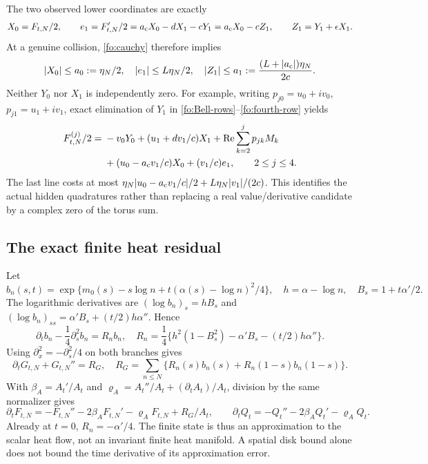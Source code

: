\documentclass[11pt]{article}
\numberwithin{equation}{section}
\theoremstyle{definition}
\theoremstyle{remark}
\begin{document}
The two observed lower coordinates are exactly
\begin{equation}
X_0=F_{t,N}/2,\qquad e_1=F_{t,N}'/2
   =a_{\rm c}X_0-dX_1-cY_1=a_{\rm c}X_0-cZ_1,
\qquad Z_1=Y_1+\epsilon X_1.
\label{fo:candidate-coordinates}
\end{equation}
At a genuine collision, \eqref{fo:cauchy} therefore implies
\begin{equation}
|X_0|\le a_0:=\eta_N/2,\quad |e_1|\le L\eta_N/2,
\quad |Z_1|\le a_1:=\frac{(L+|a_{\rm c}|)\eta_N}{2c}.
\label{fo:candidate-box}
\end{equation}
Neither $Y_0$ nor $X_1$ is independently zero.  For example, writing
$p_{j0}=u_0+iv_0$, $p_{j1}=u_1+iv_1$, exact elimination of $Y_1$
in \eqref{fo:Bell-rows}--\eqref{fo:fourth-row} yields
\begin{align}
F_{t,N}^{(j)}/2={}&-v_0Y_0+(u_1+dv_1/c)X_1
     +\operatorname{Re}\sum_{k=2}^j p_{jk}M_k\nonumber\\
&+(u_0-a_{\rm c}v_1/c)X_0+(v_1/c)e_1,
\qquad 2\le j\le4.
\label{fo:elimination}
\end{align}
The last line costs at most
$\eta_N|u_0-a_{\rm c}v_1/c|/2+L\eta_N|v_1|/(2c)$.
This identifies the actual hidden quadratures rather than replacing a
real value/derivative candidate by a complex zero of the torus sum.

\subsection{The exact finite heat residual}
\label{fo:heat-residual}
Let
\begin{equation}
b_n(s,t)=\exp\{m_0(s)-s\log n+t(\alpha(s)-\log n)^2/4\},
\quad h=\alpha-\log n,\quad B_s=1+t\alpha'/2.
\end{equation}
The logarithmic derivatives are $(\log b_n)_s=hB_s$ and
$(\log b_n)_{ss}=\alpha'B_s+(t/2)h\alpha''$.  Hence
\begin{equation}
\partial_t b_n-\frac14\partial_s^2b_n=R_n b_n,
\quad
R_n=\frac14\{h^2(1-B_s^2)-\alpha'B_s-(t/2)h\alpha''\}.
\label{fo:summand-residual}
\end{equation}
Using $\partial_x^2=-\partial_s^2/4$ on both branches gives
\begin{equation}
\partial_tG_{t,N}+G_{t,N}''=R_G,
\quad
R_G=\sum_{n\le N}\{R_n(s)b_n(s)+R_n(1-s)b_n(1-s)\}.
\label{fo:G-residual}
\end{equation}
With $\beta_A=A_t'/A_t$ and
$\varrho_A=A_t''/A_t+(\partial_tA_t)/A_t$, division by the same
normalizer gives
\begin{equation}
\partial_tF_{t,N}=-F_{t,N}''-2\beta_AF_{t,N}'-\varrho_AF_{t,N}
                   +R_G/A_t,\qquad
\partial_tQ_t=-Q_t''-2\beta_AQ_t'-\varrho_AQ_t.
\label{fo:normalized-residual}
\end{equation}
Already at $t=0$, $R_n=-\alpha'/4$.  The finite state is thus an
approximation to the scalar heat flow, not an invariant finite heat
manifold.  A spatial disk bound alone does not bound the time derivative
of its approximation error.
\end{document}
